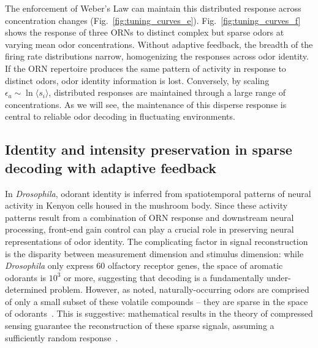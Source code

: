 The enforcement of Weber's Law can maintain this distributed response across concentration changes (Fig.~\ref{fig:tuning_curves_e}). Fig.~\ref{fig:tuning_curves_f} shows the response of three ORNs to distinct complex but sparse odors at varying mean odor concentrations. Without adaptive feedback, the breadth of the firing rate distributions narrow, homogenizing the responses across odor identity. If the ORN repertoire produces the same pattern of activity in response to distinct odors, odor identity information is lost. Conversely, by scaling $\epsilon_a \sim \ln \langle s_i \rangle$, distributed responses are maintained through a large range of concentrations. As we will see, the maintenance of this disperse response is central to reliable odor decoding in fluctuating  environments. 






\subsection{Identity and intensity preservation in sparse decoding with adaptive feedback}


In \textit{Drosophila}, odorant identity is inferred from spatiotemporal patterns of neural activity in Kenyon cells housed in the mushroom body. Since these activity patterns result from a combination of ORN response and downstream neural processing, front-end gain control can play a crucial role in preserving neural representations of odor identity. The complicating factor in signal reconstruction is the disparity between measurement dimension and stimulus dimension: while \textit{Drosophila} only express 60 olfactory receptor genes, the space of aromatic odorants is $10^3$ or more, suggesting that decoding is a fundamentally under-determined problem. However, as noted, naturally-occurring odors are comprised of only a small subset of these volatile compounds -- they are sparse in the space of odorants~\cite{vijay_1}. This is suggestive: mathematical results in the theory of compressed sensing guarantee the reconstruction of these sparse signals, assuming a sufficiently random response~\cite{CS_donoho, CS_tao, CS_ganguli}.



